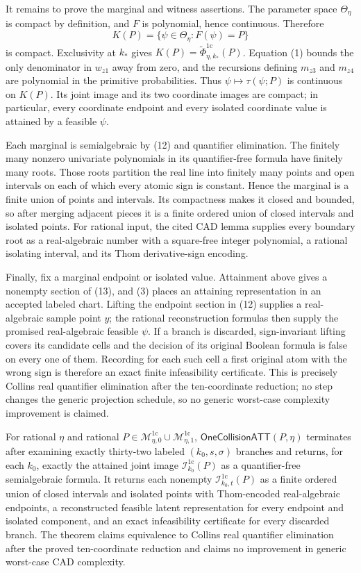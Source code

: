 It remains to prove the marginal and witness assertions.  The parameter
space \(\Theta_\eta\) is compact by definition, and \(F\) is polynomial,
hence continuous.  Therefore
\[
K(P)=\{\psi\in\Theta_\eta:F(\psi)=P\}
\tag{13}
\]
is compact.  Exclusivity at \(k_\ast\) gives
\(K(P)=\widetilde\Phi_{\eta,k_\ast}^{1\mathrm c}(P)\).  Equation (1) bounds
the only denominator in \(w_{z1}\) away from zero, and the recursions defining
\(m_{z3}\) and \(m_{z4}\) are polynomial in the primitive probabilities.
Thus \(\psi\mapsto\tau(\psi;P)\) is continuous on \(K(P)\).  Its joint image
and its two coordinate images are compact; in particular, every coordinate
endpoint and every isolated coordinate value is attained by a feasible
\(\psi\).

Each marginal is semialgebraic by (12) and quantifier elimination.  The
finitely many nonzero univariate polynomials in its quantifier-free formula
have finitely many roots.  Those roots partition the real line into finitely
many points and open intervals on each of which every atomic sign is
constant.  Hence the marginal is a finite union of points and intervals.
Its compactness makes it closed and bounded, so after merging adjacent
pieces it is a finite ordered union of closed intervals and isolated points.
For rational input, the cited CAD lemma supplies every boundary root as a
real-algebraic number with a square-free integer polynomial, a rational
isolating interval, and its Thom derivative-sign encoding.

Finally, fix a marginal endpoint or isolated value.  Attainment above gives
a nonempty section of (13), and (3) places an attaining representation in an
accepted labeled chart.  Lifting the endpoint section in (12) supplies a
real-algebraic sample point \(y\); the rational reconstruction formulas then
supply the promised real-algebraic feasible \(\psi\).  If a branch is
discarded, sign-invariant lifting covers its candidate cells and the decision
of its original Boolean formula is false on every one of them.  Recording for
each such cell a first original atom with the wrong sign is therefore an exact
finite infeasibility certificate.  This is precisely Collins real quantifier
elimination after the ten-coordinate reduction; no step changes the generic
projection schedule, so no generic worst-case complexity improvement is
claimed.

For rational \(\eta\) and rational
\(P\in\mathcal M_{\eta,0}^{1\mathrm c}\cup
\mathcal M_{\eta,1}^{1\mathrm c}\),
\(\mathsf{OneCollisionATT}(P,\eta)\) terminates after examining exactly
thirty-two labeled \((k_0,s,\sigma)\) branches and returns, for each \(k_0\),
exactly the attained joint image \(\mathcal I_{k_0}^{1\mathrm c}(P)\) as a
quantifier-free semialgebraic formula. It returns each nonempty
\(\mathcal I_{k_0,t}^{1\mathrm c}(P)\) as a finite ordered union of closed
intervals and isolated points with Thom-encoded real-algebraic endpoints, a
reconstructed feasible latent representation for every endpoint and isolated
component, and an exact infeasibility certificate for every discarded branch.
The theorem claims equivalence to Collins real quantifier elimination after
the proved ten-coordinate reduction and claims no improvement in generic
worst-case CAD complexity.

